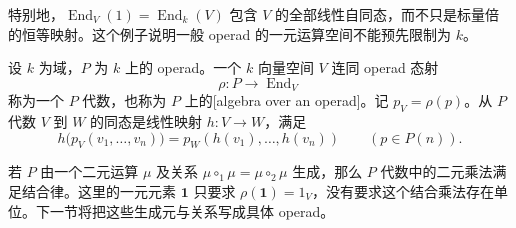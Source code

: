 特别地，\(\operatorname{End}_V(1)=\operatorname{End}_k(V)\) 包含 \(V\) 的全部线性自同态，而不只是标量倍的恒等映射。这个例子说明一般 operad 的一元运算空间不能预先限制为 \(k\)。

\begin{definition}\label{b4:def:operad-algebra}
	设 \(k\) 为域，\(P\) 为 \(k\) 上的 operad。一个 \(k\) 向量空间 \(V\) 连同 operad 态射
	\[
		\rho:P\longrightarrow\operatorname{End}_V
	\]
	称为一个 \(P\) 代数，也称为 \(P\) 上的[algebra over an operad]。记 \(p_V=\rho(p)\)。从 \(P\) 代数 \(V\) 到 \(W\) 的同态是线性映射 \(h:V\rightarrow W\)，满足
	\[
		h\bigl(p_V(v_1,\ldots,v_n)\bigr)=p_W(h(v_1),\ldots,h(v_n))
		\qquad(p\in P(n)).
	\]
\end{definition}

若 \(P\) 由一个二元运算 \(\mu\) 及关系 \(\mu\circ_1\mu=\mu\circ_2\mu\) 生成，那么 \(P\) 代数中的二元乘法满足结合律。这里的一元元素 \(\mathbf1\) 只要求 \(\rho(\mathbf1)=1_V\)，没有要求这个结合乘法存在单位。下一节将把这些生成元与关系写成具体 operad。

